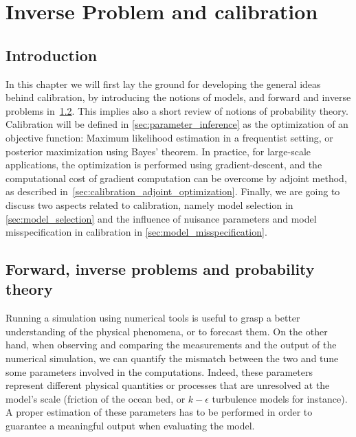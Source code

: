 \documentclass[../../Main_ManuscritThese.tex]{subfiles}
\begin{document}
\dominitoc
\faketableofcontents
\chapter{Inverse Problem and calibration}
\label{chap:inverse_problem}

\minitoc
\newpage
\subfileLocal{\pagestyle{contentStyle}}

\section{Introduction}
\label{sec:intro_chap2}
In this chapter we will first lay the ground for developing the general ideas behind calibration, by introducing the notions of models, and forward and inverse problems in~\cref{sec:forward_inverse_problem_proba_theory}. This implies also a short review of notions of probability theory. Calibration will be defined in \cref{sec:parameter_inference} as the optimization of an objective function: Maximum likelihood estimation in a frequentist setting, or posterior maximization using Bayes' theorem. In practice, for large-scale applications, the optimization is performed using gradient-descent, and the computational cost of gradient computation can be overcome by adjoint method, as described in~\cref{sec:calibration_adjoint_optimization}. Finally, we are going to discuss two aspects related to calibration, namely model selection in \cref{sec:model_selection} and the influence of nuisance parameters and model misspecification in calibration in \cref{sec:model_misspecification}.

\section{Forward, inverse problems and probability theory}
\label{sec:forward_inverse_problem_proba_theory}
Running a simulation using numerical tools is useful to grasp a better understanding of the physical phenomena, or to forecast them. On the other hand, when observing and comparing the measurements and the output of the numerical simulation, we can quantify the mismatch between the two and tune some parameters involved in the computations. Indeed, these parameters represent different physical quantities or processes that are unresolved at the model's scale (friction of the ocean bed, or $k-\epsilon$ turbulence models for instance). A proper estimation of these parameters has to be performed in order to guarantee a meaningful output when evaluating the model.
\end{document}

